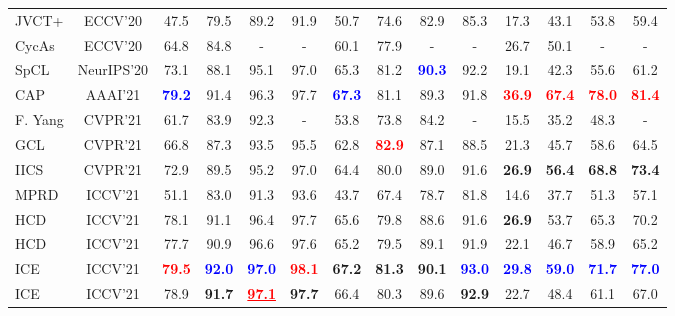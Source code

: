 \documentclass[lettersize,journal]{IEEEtran}
\begin{document}
\begin{table*}
\begin{center}
\begin{tabular}{l|c||c|c|c|c|c|c|c|c|c|c|c|c}
JVCT+ \cite{JVCT} & ECCV'20 & 47.5 & 79.5 & 89.2 & 91.9 & 50.7 & 74.6 & 82.9 & 85.3 & 17.3 & 43.1 & 53.8 & 59.4 \\
\rowcolor{mygray}
CycAs \cite{CycAs} & ECCV'20 & 64.8 & 84.8 & - & - & 60.1 & 77.9 & - & - & 26.7 & 50.1 & - & -
\\
SpCL \cite{SpCL} & NeurIPS'20 & 73.1 & 88.1 & 95.1 & 97.0 & 65.3 & 81.2 & \textcolor{blue}{\textbf{90.3}} & 92.2 & 19.1 & 42.3 & 55.6 & 61.2 \\
\rowcolor{mygray}
CAP \cite{CAP} & AAAI'21 & \textcolor{blue}{\textbf{79.2}} & 91.4 & 96.3 & 97.7 & \textcolor{blue}{\textbf{67.3}} & 81.1 & 89.3 & 91.8 & \textcolor{red}{\textbf{36.9}} & \textcolor{red}{\textbf{67.4}} & \textcolor{red}{\textbf{78.0}} & \textcolor{red}{\textbf{81.4}} \\
F. Yang \cite{DSCE} & CVPR'21 & 61.7 & 83.9 & 92.3 & - & 53.8 & 73.8 & 84.2 & - & 15.5 & 35.2 & 48.3 & - \\
\rowcolor{mygray}
GCL \cite{GCL} & CVPR'21 & 66.8 & 87.3 & 93.5 & 95.5 & 62.8 & \textcolor{red}{\textbf{82.9}} & 87.1 & 88.5 & 21.3 & 45.7 & 58.6 & 64.5 \\
IICS \cite{IICS} & CVPR'21 & 72.9 & 89.5 & 95.2 & 97.0 & 64.4 & 80.0 & 89.0 & 91.6 & \textcolor{mygreen}{\textbf{26.9}} & \textcolor{mygreen}{\textbf{56.4}} & \textcolor{mygreen}{\textbf{68.8}} & \textcolor{mygreen}{\textbf{73.4}} \\
\rowcolor{mygray}
MPRD \cite{MPRD} & ICCV'21 & 51.1 & 83.0 & 91.3 & 93.6 & 43.7 & 67.4 & 78.7 & 81.8 & 14.6 & 37.7 & 51.3 & 57.1 \\
HCD \cite{HCD} & ICCV'21 & 78.1 & 91.1 & 96.4 & 97.7 & 65.6 & 79.8 & 88.6 & 91.6 & \textcolor{mygreen}{\textbf{26.9}} & 53.7 & 65.3 & 70.2 \\
\rowcolor{mygray}
HCD \cite{HCD} & ICCV'21 & 77.7 & 90.9 & 96.6 & 97.6 & 65.2 & 79.5 & 89.1 & 91.9 & 22.1 & 46.7 & 58.9 & 65.2 \\
ICE \cite{ICE} & ICCV'21 & \textcolor{red}{\textbf{79.5}} & \textcolor{blue}{\textbf{92.0}} & \textcolor{blue}{\textbf{97.0}} & \textcolor{red}{\textbf{98.1}} & \textcolor{mygreen}{\textbf{67.2}} & \textcolor{mygreen}{\textbf{81.3}} & \textcolor{mygreen}{\textbf{90.1}} & \textcolor{blue}{\textbf{93.0}} & \textcolor{blue}{\textbf{29.8}} & \textcolor{blue}{\textbf{59.0}} & \textcolor{blue}{\textbf{71.7}} & \textcolor{blue}{\textbf{77.0}} \\
\rowcolor{mygray}
ICE \cite{ICE} & ICCV'21 & 78.9 & \textcolor{mygreen}{\textbf{91.7}} & \textcolor{red}{\textbf{\underline{97.1}}} & \textcolor{mygreen}{\textbf{97.7}} & 66.4 & 80.3 & 89.6 & \textcolor{mygreen}{\textbf{92.9}} & 22.7 & 48.4 & 61.1 & 67.0 \\

\end{tabular}
\end{center}
\end{table*}
\end{document}
